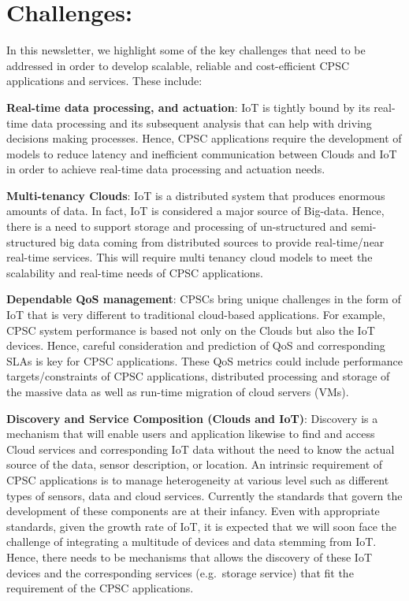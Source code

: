 \section*{Challenges:}

In this newsletter, we highlight some of the key challenges that need to be addressed in order to develop scalable, reliable and cost-efficient CPSC applications and services. These include:

\textbf{Real-time data processing, and actuation}:
IoT is tightly bound by its real-time data processing and its subsequent analysis that can help with driving decisions making processes.
Hence, CPSC applications require the development of models to reduce latency and inefficient communication between Clouds and IoT in order to achieve real-time data processing and actuation needs. 

\textbf{Multi-tenancy Clouds}:
IoT is a distributed system that produces enormous amounts of data.
In fact, IoT is considered a major source of Big-data.
Hence, there is a need to support storage and processing of un-structured and semi-structured big data coming from distributed sources to provide real-time/near real-time services.
This will require multi tenancy cloud models to meet the scalability and real-time needs of CPSC applications.

\textbf{Dependable QoS management}:
CPSCs bring unique challenges in the form of IoT that is very different to traditional cloud-based applications.
For example, CPSC system performance is based not only on the Clouds but also the IoT devices.
Hence, careful consideration and prediction of QoS and corresponding SLAs is key for CPSC applications.
These QoS metrics could include performance targets/constraints of CPSC applications, distributed processing and storage of the massive data as well as run-time migration of cloud servers (VMs).

\textbf{Discovery and Service Composition (Clouds and IoT)}:
Discovery is a mechanism that will enable users and application likewise to find and access Cloud services and corresponding IoT data without the need to know the actual source of the data, sensor description, or location.
An intrinsic requirement of CPSC applications is to manage heterogeneity at various level such as different types of sensors, data and cloud services.
Currently the standards that govern the development of these components are at their infancy.
Even with appropriate standards, given the growth rate of IoT, it is expected that we will soon face the challenge of integrating a multitude of devices and data stemming from IoT.
Hence, there needs to be mechanisms that allows the discovery of these IoT devices and the corresponding services (e.g.~storage service) that fit the requirement of the CPSC applications.


